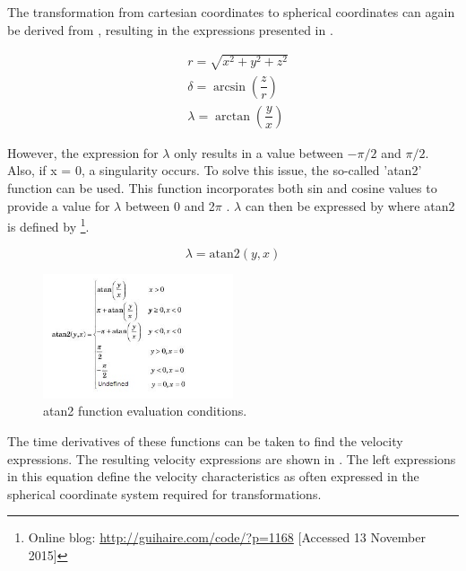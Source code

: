 \noindent
The transformation from cartesian coordinates to spherical coordinates can again be derived from , resulting in the expressions presented in .

\begin{equation} \label{eq:carttospherp}
\begin{split}
& r=\sqrt{x^{2}+y^{2}+z^{2}}\\
& \delta=\arcsin\left(\dfrac{z}{r}\right)\\
& \lambda=\arctan\left(\dfrac{y}{x}\right)
\end{split}
\end{equation}

\noindent
However, the expression for $\lambda$ only results in a value between $-\pi/2$ and $\pi/2$. Also, if x = 0, a singularity occurs. To solve this issue, the so-called 'atan2' function can be used. This function incorporates both sin and cosine values to provide a value for $\lambda$ between 0 and 2$\pi$ \citep{noomen2013basic}. $\lambda$ can then be expressed by  where atan2 is defined by \footnote{Online blog: \url{http://guihaire.com/code/?p=1168} [Accessed 13 November 2015]}.

\begin{equation} \label{eq:simpatan2}
\lambda=\text{atan}2\left(y,x\right)
\end{equation}


\begin{figure}[!ht]
\centering
\includegraphics[width=0.5\textwidth]{figures/reference_frames/atan2_guilhaire2013.jpg}
\caption{atan2 function evaluation conditions.}
\label{fig:atan2_guilhaire2013}
\end{figure}

\noindent
The time derivatives of these functions can be taken to find the velocity expressions. The resulting velocity expressions are shown in . The left expressions in this equation define the velocity characteristics as often expressed in the spherical coordinate system required for transformations.

